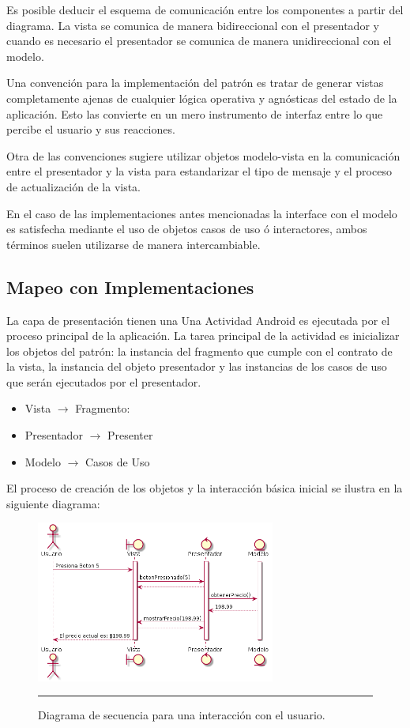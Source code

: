 Es posible deducir el esquema de comunicación entre los componentes a partir del diagrama. La vista se comunica de manera bidireccional con el presentador y cuando es necesario el presentador se comunica de manera unidireccional con el modelo.


Una convención para la implementación del patrón es tratar de generar vistas completamente ajenas de cualquier lógica operativa y agnósticas del estado de la aplicación. Esto las convierte en un mero instrumento de interfaz entre lo que percibe el usuario y sus reacciones. 

Otra de las convenciones sugiere utilizar objetos modelo-vista en la comunicación entre el presentador y la vista para estandarizar el tipo de mensaje y el proceso de actualización de la vista.

En el caso de las implementaciones antes mencionadas la interface con el modelo es satisfecha mediante el uso de objetos casos de uso ó interactores, ambos términos suelen utilizarse de manera intercambiable.

\subsection{Mapeo con Implementaciones}
La capa de presentación tienen una
Una Actividad Android es ejecutada por el proceso principal de la aplicación. La tarea principal de la actividad es inicializar los objetos del patrón: la instancia del fragmento que cumple con el contrato de la vista, la instancia del objeto presentador y las instancias de los casos de uso que serán ejecutados por el presentador.
\begin{itemize}
	\item Vista $\rightarrow$ Fragmento: 
	\item Presentador $\rightarrow$ Presenter
	\item Modelo $\rightarrow$ Casos de Uso
\end{itemize}

El proceso de creación de los objetos y la interacción básica inicial se ilustra en la siguiente diagrama:

\begin{figure}[htbp]
	\centering
	\includegraphics[width=0.7\textwidth]{Figures/uml_mvp_sequence.png}
	\rule{35em}{1pt}
	\caption[MVP Sequence]{Diagrama de secuencia para una interacción con el usuario.}
	\label{fig:uml_mvp_sequence}
\end{figure}

